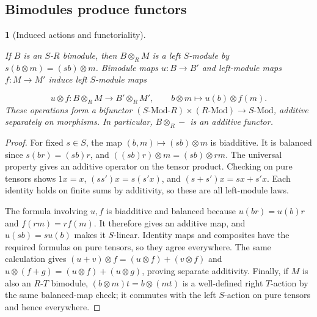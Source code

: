 \documentclass[11pt,a4paper]{article}
\newcommand{\mathheading}{}
\theoremstyle{plain}
\newtheorem*{plainstatement}{\mathheading}
\theoremstyle{definition}
\newenvironment{mathstatement}[3]{\renewcommand{\mathheading}{#1 #2}\begin{plainstatement}[#3]}{\end{plainstatement}}
\begin{document}
\subsection{Bimodules produce functors}
\label{actions}
 
\begin{mathstatement}{Proposition}{6.3}{Induced actions and functoriality}
\label{env-6-3}

If \(B\) is an \(S\)-\(R\) bimodule, then \(B\otimes_R M\) is a left \(S\)-module by \(s(b\otimes m)=(sb)\otimes m\). Bimodule maps \(u:B\to B'\) and left-module maps \(f:M\to M'\) induce left \(S\)-module maps

 \[u\otimes f:B\otimes_R M\longrightarrow B'\otimes_R M',\qquad b\otimes m\longmapsto u(b)\otimes f(m).\] 
These operations form a bifunctor \((S\text{-}\mathrm{Mod}\text{-}R)\times(R\text{-}\mathrm{Mod})\to S\text{-}\mathrm{Mod}\), additive separately on morphisms. In particular, \(B\otimes_R-\) is an additive functor.


\par{}\par

\end{mathstatement}
 
\begin{proof}

For fixed \(s\in S\), the map \((b,m)\mapsto(sb)\otimes m\) is biadditive. It is balanced since \(s(br)=(sb)r\), and \(((sb)r)\otimes m=(sb)\otimes rm\). The universal property gives an additive operator on the tensor product. Checking on pure tensors shows \(1x=x\), \((ss')x=s(s'x)\), and \((s+s')x=sx+s'x\). Each identity holds on finite sums by additivity, so these are all left-module laws.


The formula involving \(u,f\) is biadditive and balanced because \(u(br)=u(b)r\) and \(f(rm)=rf(m)\). It therefore gives an additive map, and \(u(sb)=su(b)\) makes it \(S\)-linear. Identity maps and composites have the required formulas on pure tensors, so they agree everywhere. The same calculation gives \((u+v)\otimes f=(u\otimes f)+(v\otimes f)\) and \(u\otimes(f+g)=(u\otimes f)+(u\otimes g)\), proving separate additivity. Finally, if \(M\) is also an \(R\)-\(T\) bimodule, \( (b\otimes m)t=b\otimes(mt)\) is a well-defined right \(T\)-action by the same balanced-map check; it commutes with the left \(S\)-action on pure tensors and hence everywhere.


\end{proof}
 
\end{document}

